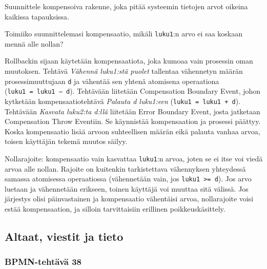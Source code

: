 \documentclass[
  finnish,
  letterpaper,
  DIV=11,
  numbers=noendperiod,
  oneside]{scrreprt}
\begin{document}
Suunnittele kompensoiva rakenne, joka pitää systeemin tietojen arvot
oikeina kaikissa tapauksissa.

Toimiiko suunnittelemasi kompensaatio, mikäli \texttt{luku1}:n arvo ei
saa koskaan mennä alle nollan?

\begin{tcolorbox}[enhanced jigsaw, arc=.35mm, bottomrule=.15mm, bottomtitle=1mm, breakable, colback=white, colbacktitle=quarto-callout-tip-color!10!white, colframe=quarto-callout-tip-color-frame, coltitle=black, left=2mm, leftrule=.75mm, opacityback=0, opacitybacktitle=0.6, rightrule=.15mm, title=\textcolor{quarto-callout-tip-color}{\faLightbulb}\hspace{0.5em}{Malliratkaisu}, titlerule=0mm, toprule=.15mm, toptitle=1mm]

Rollbackin sijaan käytetään kompensaatiota, joka kumoaa vain prosessin
oman muutoksen. Tehtävä \emph{Vähennä luku1:stä puolet} tallentaa
vähennetyn määrän prosessimuuttujaan \texttt{d} ja vähentää sen yhtenä
atomisena operaationa (\texttt{luku1\ =\ luku1\ −\ d}). Tehtävään
liitetään Compensation Boundary Event, johon kytketään
kompensaatiotehtävä \emph{Palauta d luku1:een}
(\texttt{luku1\ =\ luku1\ +\ d}). Tehtävään \emph{Kasvata luku2:ta
d:llä} liitetään Error Boundary Event, josta jatketaan Compensation
Throw Eventiin. Se käynnistää kompensaation ja prosessi päättyy. Koska
kompensaatio lisää arvoon suhteellisen määrän eikä palauta vanhaa arvoa,
toisen käyttäjän tekemä muutos säilyy.

Nollarajoite: kompensaatio vain kasvattaa \texttt{luku1}:n arvoa, joten
se ei itse voi viedä arvoa alle nollan. Rajoite on kuitenkin
tarkistettava vähennyksen yhteydessä samassa atomisessa operaatiossa
(vähennetään vain, jos \texttt{luku1\ \textgreater{}=\ d}). Jos arvo
luetaan ja vähennetään erikseen, toinen käyttäjä voi muuttaa sitä
välissä. Jos järjestys olisi päinvastainen ja kompensaatio vähentäisi
arvoa, nollarajoite voisi estää kompensaation, ja silloin tarvittaisiin
erillinen poikkeuskäsittely.

\end{tcolorbox}

\subsection{Altaat, viestit ja tieto}\label{altaat-viestit-ja-tieto}

\subsubsection{BPMN-tehtävä 38}\label{bpmn-tehtuxe4vuxe4-38}
\end{document}
